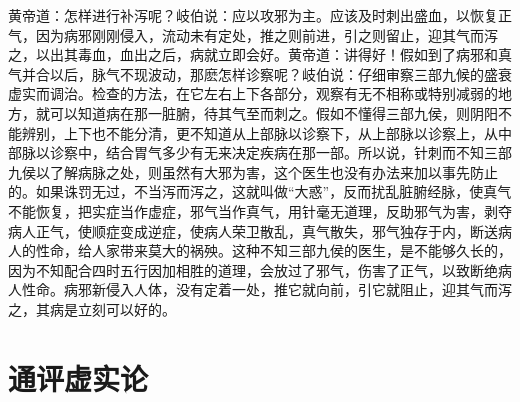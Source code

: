 \documentclass[a4paper,12pt,UTF8,twoside]{ctexbook}
\begin{document}
黄帝道：怎样进行补泻呢？岐伯说：应以攻邪为主。应该及时刺出盛血，以恢复正气，因为病邪刚刚侵入，流动未有定处，推之则前进，引之则留止，迎其气而泻之，以出其毒血，血出之后，病就立即会好。黄帝道：讲得好！假如到了病邪和真气并合以后，脉气不现波动，那麽怎样诊察呢？岐伯说：仔细审察三部九候的盛衰虚实而调治。检查的方法，在它左右上下各部分，观察有无不相称或特别减弱的地方，就可以知道病在那一脏腑，待其气至而刺之。假如不懂得三部九侯，则阴阳不能辨别，上下也不能分清，更不知道从上部脉以诊察下，从上部脉以诊察上，从中部脉以诊察中，结合胃气多少有无来决定疾病在那一部。所以说，针刺而不知三部九侯以了解病脉之处，则虽然有大邪为害，这个医生也没有办法来加以事先防止的。如果诛罚无过，不当泻而泻之，这就叫做“大惑”，反而扰乱脏腑经脉，使真气不能恢复，把实症当作虚症，邪气当作真气，用针毫无道理，反助邪气为害，剥夺病人正气，使顺症变成逆症，使病人荣卫散乱，真气散失，邪气独存于内，断送病人的性命，给人家带来莫大的祸殃。这种不知三部九侯的医生，是不能够久长的，因为不知配合四时五行因加相胜的道理，会放过了邪气，伤害了正气，以致断绝病人性命。病邪新侵入人体，没有定着一处，推它就向前，引它就阻止，迎其气而泻之，其病是立刻可以好的。

\chapter{通评虚实论}
\end{document}
